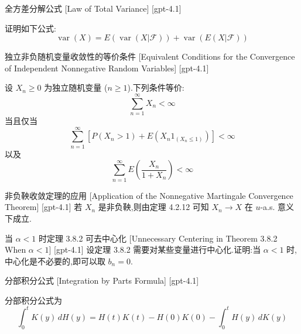 \documentclass[UTF8]{ctexart}
\begin{document}
    
    
    \begin{thm}
        {全方差分解公式}
        [Law of Total Variance]
        [gpt-4.1]
        
证明如下公式:
\[
\operatorname { var }( X ) = E ( \operatorname { var }( X | \mathcal { F } ) ) + \operatorname { var }( E ( X | \mathcal { F } ) )
\]

    \end{thm}
    
    
    
    \begin{thm}
        {独立非负随机变量收敛性的等价条件}
        [Equivalent Conditions for the Convergence of Independent Nonnegative Random Variables]
        [gpt-4.1]
        
设 $X_n \geq 0$ 为独立随机变量 ($n \geq 1$).下列条件等价:
\[
\sum_{n = 1}^{\infty} X_n < \infty
\]
当且仅当
\[
\sum_{n = 1}^{\infty} [ P(X_n > 1) + E(X_n 1_{(X_n \leq 1)}) ] < \infty
\]
以及
\[
\sum_{n = 1}^{\infty} E \left( \frac{X_n}{1 + X_n} \right) < \infty
\]

    \end{thm}
    
    
    
    \begin{thm}
        {非负鞅收敛定理的应用}
        [Application of the Nonnegative Martingale Convergence Theorem]
        [gpt-4.1]
        若 $X_{n}$ 是非负鞅,则由定理 4.2.12 可知 $X_{n} \to X$ 在 $
u$-a.s. 意义下成立.
    \end{thm}
    
    
    
    \begin{thm}
        {当 $\alpha < 1$ 时定理 3.8.2 可去中心化}
        [Unnecessary Centering in Theorem 3.8.2 When $\alpha < 1$]
        [gpt-4.1]
        设定理 3.8.2 需要对某些变量进行中心化.证明:当 $\alpha < 1$ 时,中心化是不必要的,即可以取 $b_n = 0$.
    \end{thm}
    
    
    
    \begin{ppt}
        {分部积分公式}
        [Integration by Parts Formula]
        [gpt-4.1]
        
分部积分公式为
\[
\int_0^t K(y)\,dH(y) = H(t)K(t) - H(0)K(0) - \int_0^t H(y)\,dK(y)
\]

    \end{ppt}
    
\end{document}
